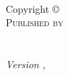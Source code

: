 \thispagestyle{empty} %

~\vfill %

\noindent Copyright \copyright\ \BookYear\ \BookAuthor\\ %

\noindent \textsc{Published by \BookPublisher}\\ %

\noindent \textsc{\BookWebsite}\\ %

\noindent  \\ %

\noindent \textit{Version \BookVersion, \BookMonth\ \BookYear} %